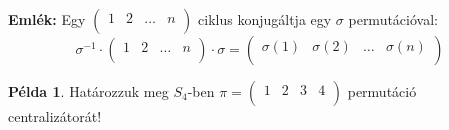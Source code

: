 \documentclass[12pt]{book}
\theoremstyle{plain} %
\theoremstyle{definition} %
\newtheorem{pl}{Példa}[section]
\theoremstyle{remark}
\numberwithin{equation}{section}  %
\begin{document}
	\textbf{Emlék:} Egy $
	\begin{pmatrix}
	1 & 2 & \ldots & n\\
	\end{pmatrix}$ ciklus konjugáltja egy $\sigma$ permutációval: 
	\[  \sigma^{-1} \cdot 
	\begin{pmatrix}
	1 & 2 & \ldots & n\\
	\end{pmatrix}
	\cdot \sigma = 
	\begin{pmatrix}
	\sigma(1) & \sigma(2) & \ldots & \sigma(n)\\
	\end{pmatrix} \]
	
	\begin{pl}
		Határozzuk meg $S_4$-ben $\pi = \begin{pmatrix}
		1 & 2 & 3 & 4 \\
		\end{pmatrix}$ permutáció centralizátorát!
		

\end{pl}
\end{document}
